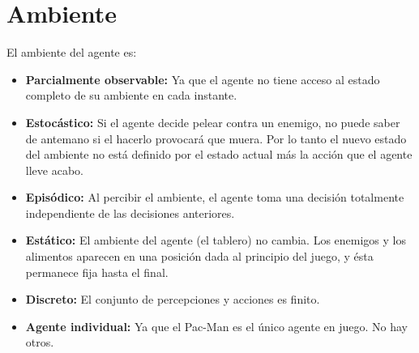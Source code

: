 \section{Ambiente}

El ambiente del agente es:

\begin{itemize}
\item \textbf{Parcialmente observable:} Ya que el agente no tiene acceso al
estado completo de su ambiente en cada instante.

\item \textbf{Estocástico:} Si el agente decide pelear contra un enemigo, no
puede saber de antemano si el hacerlo provocará que muera. Por lo tanto el
nuevo estado del ambiente no está definido por el estado actual más la acción
que el agente lleve acabo.

\item \textbf{Episódico:} Al percibir el ambiente, el agente toma una decisión
totalmente independiente de las decisiones anteriores.

\item \textbf{Estático:} El ambiente del agente (el tablero) no cambia. Los
enemigos y los alimentos aparecen en una posición dada al principio del juego,
y ésta permanece fija hasta el final.

\item \textbf{Discreto:} El conjunto de percepciones y acciones es finito.

\item \textbf{Agente individual:} Ya que el Pac-Man es el único agente en
juego.  No hay otros.

\end{itemize}
